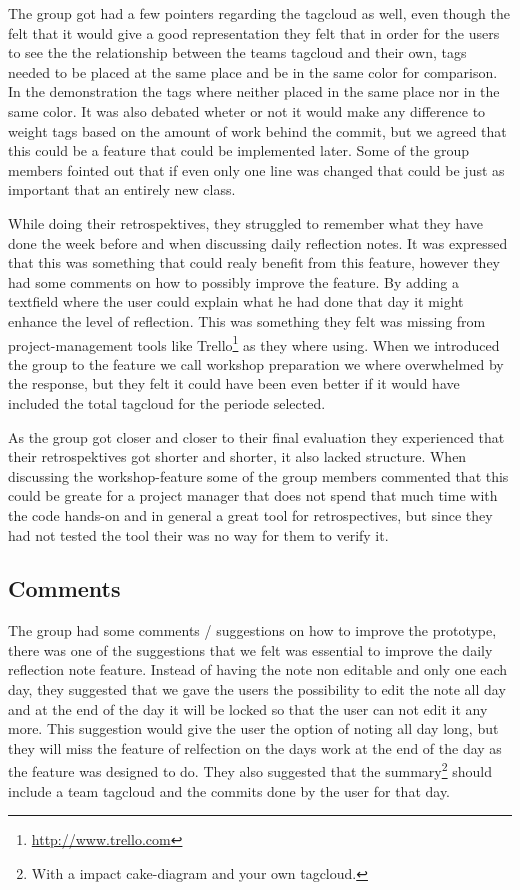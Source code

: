 The group got had a few pointers regarding the tagcloud as well, even though the felt that it would give a good representation they felt that in order for the users to see the the relationship between the teams tagcloud and their own, tags needed to be placed at the same place and be in the same color for comparison. In the demonstration the tags where neither placed in the same place nor in the same color. It was also debated wheter or not it would make any difference to weight tags based on the amount of work behind the commit, but we agreed that this could be a feature that could be implemented later. Some of the group members fointed out that if even only one line was changed that could be just as important that an entirely new class.

While doing their retrospektives, they struggled to remember what they have done the week before and when discussing daily reflection notes. It was expressed that this was something that could realy benefit from this feature, however they had some comments on how to possibly improve the feature. By adding a textfield where the user could explain what he had done that day it might enhance the level of reflection. This was something they felt was missing from project-management tools like Trello\footnote{\url{http://www.trello.com}} as they where using. When we introduced the group to the feature we call workshop preparation we where overwhelmed by the response, but they felt it could have been even better if it would have included the total tagcloud for the periode selected.

As the group got closer and closer to their final evaluation they experienced that their retrospektives got shorter and shorter, it also lacked structure. When discussing the workshop-feature some of the group members commented that this could be greate for a project manager that does not spend that much time with the code hands-on and in general a great tool for retrospectives, but since they had not tested the tool their was no way for them to verify it.


\subsection{Comments}
The group had some comments / suggestions on how to improve the prototype, there was one of the suggestions that we felt was essential to improve the daily reflection note feature. Instead of having the note non editable and only one each day, they suggested that we gave the users the possibility to edit the note all day and at the end of the day it will be locked so that the user can not edit it any more. This suggestion would give the user the option of noting all day long, but they will miss the feature of relfection on the days work at the end of the day as the feature was designed to do. They also suggested that the summary\footnote{With a impact cake-diagram and your own tagcloud.} should include a team tagcloud and the commits done by the user for that day.

